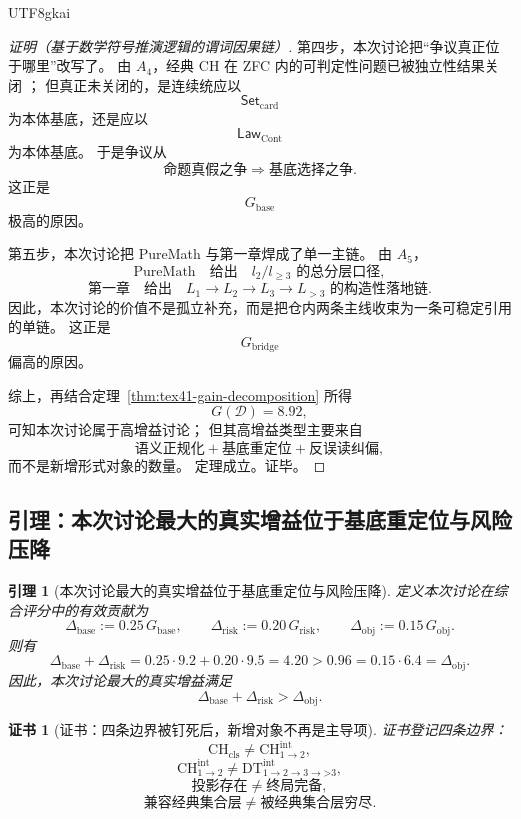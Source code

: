 \documentclass[12pt]{article}
\newtheorem{lemma}{引理}[section]
\newtheorem{Certificate}{证书}[section]
\newcommand{\LawCont}{\mathsf{Law}_{\mathrm{Cont}}}
\newcommand{\SetCard}{\mathsf{Set}_{\mathrm{card}}}
\begin{document}
\begin{CJK*}{UTF8}{gkai}
\begin{proof}[证明（基于数学符号推演逻辑的谓词因果链）]
第四步，本次讨论把“争议真正位于哪里”改写了。
由 $A_4$，经典 CH 在 ZFC 内的可判定性问题已被独立性结果关闭
\cite{Godel1940CH,Cohen1963CHI,Cohen1964CHII,Jech2003SetTheory}；
但真正未关闭的，是连续统应以
\[
  \SetCard
\]
为本体基底，还是应以
\[
  \LawCont
\]
为本体基底。
于是争议从
\[
  \text{命题真假之争}
  \Longrightarrow
  \text{基底选择之争}.
\]
这正是
\[
  G_{\mathrm{base}}
\]
极高的原因。

第五步，本次讨论把 PureMath 与第一章焊成了单一主链。
由 $A_5$，
\[
  \text{PureMath}
  \quad\text{给出}\quad
  l_2/l_{\ge3}\text{ 的总分层口径},
\]
\[
  \text{第一章}
  \quad\text{给出}\quad
  L_1\to L_2\to L_3\to L_{>3}\text{ 的构造性落地链}.
\]
因此，本次讨论的价值不是孤立补充，而是把仓内两条主线收束为一条可稳定引用的单链。
这正是
\[
  G_{\mathrm{bridge}}
\]
偏高的原因。

综上，再结合定理~\ref{thm:tex41-gain-decomposition} 所得
\[
  G(\mathcal D)=8.92,
\]
可知本次讨论属于高增益讨论；
但其高增益类型主要来自
\[
  \text{语义正规化}
  +
  \text{基底重定位}
  +
  \text{反误读纠偏},
\]
而不是新增形式对象的数量。
定理成立。证毕。
\end{proof}

\subsection{引理：本次讨论最大的真实增益位于基底重定位与风险压降}
\label{subsec:tex41-ch2-lemma}

\begin{lemma}[本次讨论最大的真实增益位于基底重定位与风险压降]
\label{lem:tex41-gain-focus}
定义本次讨论在综合评分中的有效贡献为
\[
  \Delta_{\mathrm{base}}:=0.25\,G_{\mathrm{base}},
  \qquad
  \Delta_{\mathrm{risk}}:=0.20\,G_{\mathrm{risk}},
  \qquad
  \Delta_{\mathrm{obj}}:=0.15\,G_{\mathrm{obj}}.
\]
则有
\[
  \Delta_{\mathrm{base}}+\Delta_{\mathrm{risk}}
  =
  0.25\cdot 9.2 + 0.20\cdot 9.5
  =
  4.20
  >
  0.96
  =
  0.15\cdot 6.4
  =
  \Delta_{\mathrm{obj}}.
\]
因此，本次讨论最大的真实增益满足
\[
  \Delta_{\mathrm{base}}+\Delta_{\mathrm{risk}}
  >
  \Delta_{\mathrm{obj}}.
\]
\end{lemma}

\begin{Certificate}[证书：四条边界被钉死后，新增对象不再是主导项]
\label{cert:tex41-gain-focus}
证书登记四条边界：
\[
  \mathrm{CH}_{\mathrm{cls}}
  \neq
  \mathrm{CH}^{\mathrm{int}}_{1\to2},
\]
\[
  \mathrm{CH}^{\mathrm{int}}_{1\to2}
  \neq
  \mathrm{DT}^{\mathrm{int}}_{1\to2\to3\to\text{>3}},
\]
\[
  \text{投影存在}
  \neq
  \text{终局完备},
\]
\[
  \text{兼容经典集合层}
  \neq
  \text{被经典集合层穷尽}.
\]
\end{Certificate}


\end{CJK*}
\end{document}
